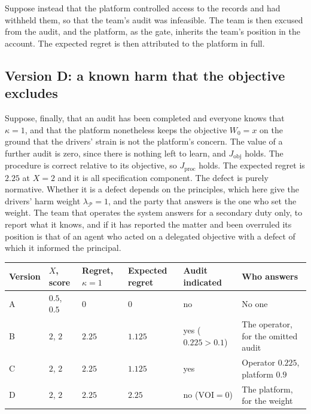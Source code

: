 \documentclass[11pt]{article}
\newcommand{\VOI}{\mathrm{VOI}}
\theoremstyle{plain}
\theoremstyle{definition}
\begin{document}
Suppose instead that the platform controlled access to the records and had withheld them, so that the team's audit was infeasible. The team is then excused from the audit, and the platform, as the gate, inherits the team's position in the account. The expected regret is then attributed to the platform in full.

\subsection*{Version D: a known harm that the objective excludes}

Suppose, finally, that an audit has been completed and everyone knows that $\kappa=1$, and that the platform nonetheless keeps the objective $W_0=x$ on the ground that the drivers' strain is not the platform's concern. The value of a further audit is zero, since there is nothing left to learn, and $J_{\mathrm{obj}}$ holds. The procedure is correct relative to its objective, so $J_{\mathrm{proc}}$ holds. The expected regret is $2.25$ at $X=2$ and it is all specification component. The defect is purely normative. Whether it is a defect depends on the principles, which here give the drivers' harm weight $\lambda_{\mathcal P}=1$, and the party that answers is the one who set the weight. The team that operates the system answers for a secondary duty only, to report what it knows, and if it has reported the matter and been overruled its position is that of an agent who acted on a delegated objective with a defect of which it informed the principal.

\begin{center}
\small
\begin{tabular}{@{}p{}p{}p{}p{}p{}p{}@{}}
\hline
Version & $X$, score & Regret, $\kappa=1$ & Expected regret & Audit indicated & Who answers\\
\hline
A & $0.5$, $0.5$ & $0$ & $0$ & no & No one\\
B & $2$, $2$ & $2.25$ & $1.125$ & yes ($0.225>0.1$) & The operator, for the omitted audit\\
C & $2$, $2$ & $2.25$ & $1.125$ & yes & Operator $0.225$, platform $0.9$\\
D & $2$, $2$ & $2.25$ & $2.25$ & no ($\VOI=0$) & The platform, for the weight\\
\hline
\end{tabular}
\end{center}
\end{document}

